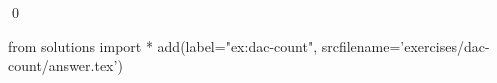 
\begin{ex} 
  \label{ex:dac-count}
  
  \qed
\end{ex} 
\begin{python0}
from solutions import *
add(label="ex:dac-count",
    srcfilename='exercises/dac-count/answer.tex') 
\end{python0}
